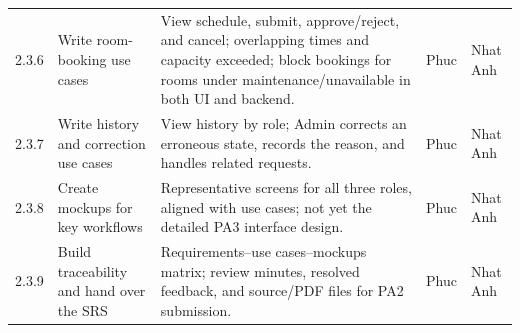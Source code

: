 \documentclass[11pt]{article}
\renewcommand{\arraystretch}{1.18}
\begin{document}
\begin{longtable}{@{}L{1.15cm}L{3.2cm}L{7.6cm}L{1.4cm}L{1.4cm}@{}}
2.3.6 & Write room-booking use cases & View schedule, submit, approve/reject, and cancel; overlapping times and capacity exceeded; block bookings for rooms under maintenance/unavailable in both UI and backend. & Phuc & Nhat Anh \\
2.3.7 & Write history and correction use cases & View history by role; Admin corrects an erroneous state, records the reason, and handles related requests. & Phuc & Nhat Anh \\
2.3.8 & Create mockups for key workflows & Representative screens for all three roles, aligned with use cases; not yet the detailed PA3 interface design. & Phuc & Nhat Anh \\
2.3.9 & Build traceability and hand over the SRS & Requirements--use cases--mockups matrix; review minutes, resolved feedback, and source/PDF files for PA2 submission. & Phuc & Nhat Anh \\
\bottomrule\end{longtable}\normalsize\setlength{\tabcolsep}{3pt}\renewcommand{\arraystretch}{1.18}
\end{document}
